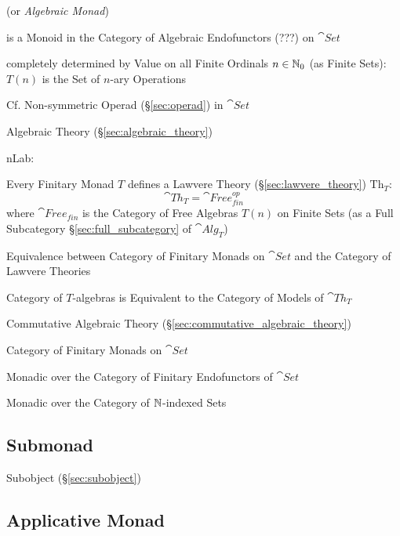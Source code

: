 (or \emph{Algebraic Monad})

is a Monoid in the Category of Algebraic Endofunctors (???) on
$\cat{Set}$

completely determined by Value on all Finite Ordinals $n \in \mathbb{N}_0$
(as Finite Sets): $T(n)$ is the Set of $n$-ary Operations

\fist Cf. Non-symmetric Operad (\S\ref{sec:operad}) in
$\cat{Set}$


\asterism


Algebraic Theory (\S\ref{sec:algebraic_theory})

nLab:

Every Finitary Monad $T$ defines a Lawvere Theory
(\S\ref{sec:lawvere_theory}) $\mathrm{Th}_T$:
\[
  \cat{Th}_T = \cat{Free}^{op}_{fin}
\]
where $\cat{Free}_{fin}$ is the Category of Free Algebras $T(n)$ on
Finite Sets (as a Full Subcategory \S\ref{sec:full_subcategory} of
$\cat{Alg}_T$) %

Equivalence between Category of Finitary Monads on $\cat{Set}$ and the
Category of Lawvere Theories %

Category of $T$-algebras is Equivalent to the Category of Models of
$\cat{Th}_T$ %

Commutative Algebraic Theory
(\S\ref{sec:commutative_algebraic_theory})

Category of Finitary Monads on $\cat{Set}$

Monadic over the Category of Finitary Endofunctors of $\cat{Set}$

Monadic over the Category of $\mathbb{N}$-indexed Sets



\subsection{Submonad}\label{sec:submonad}

Subobject (\S\ref{sec:subobject})



\subsection{Applicative Monad}\label{sec:applicative_monad}

